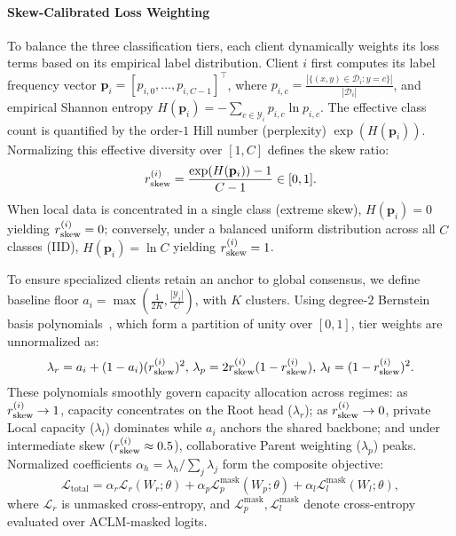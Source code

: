 \paragraph{Skew-Calibrated Loss Weighting}
To balance the three classification tiers, each client dynamically weights its loss terms based on its empirical label distribution. Client $i$ first computes its label frequency vector $\mathbf{p}_i = [p_{i,0}, \dots, p_{i,C-1}]^\top$, where $p_{i,c} = \frac{|\{(x,y) \in \mathcal{D}_i : y = c\}|}{|\mathcal{D}_i|}$, and empirical Shannon entropy $H(\mathbf{p}_i) = -\sum_{c \in \mathcal{Y}_i} p_{i,c} \ln p_{i,c}$. The effective class count is quantified by the order-$1$ Hill number (perplexity) $\exp(H(\mathbf{p}_i))$. Normalizing this effective diversity over $[1, C]$ defines the skew ratio:
\begin{equation}
\label{eq:rskew}
r_{\mathrm{skew}}^{(i)} = \frac{\exp(H(\mathbf{p}_i)) - 1}{C - 1} \in [0, 1].
\end{equation}
When local data is concentrated in a single class (extreme skew), $H(\mathbf{p}_i) = 0$ yielding $r_{\mathrm{skew}}^{(i)} = 0$; conversely, under a balanced uniform distribution across all $C$ classes (IID), $H(\mathbf{p}_i) = \ln C$ yielding $r_{\mathrm{skew}}^{(i)} = 1$.

To ensure specialized clients retain an anchor to global consensus, we define baseline floor $a_i = \max(\frac{1}{2K}, \frac{|\mathcal{Y}_i|}{C})$, with $K$ clusters. Using degree-$2$ Bernstein basis polynomials~\cite{lorentz1953bernstein}, which form a partition of unity over $[0, 1]$, tier weights are unnormalized as:
\begin{equation}
\label{eq:binomial_weights}
\lambda_r = a_i + (1-a_i)(r_{\mathrm{skew}}^{(i)})^2, \, \lambda_p = 2r_{\mathrm{skew}}^{(i)}(1-r_{\mathrm{skew}}^{(i)}), \, \lambda_l = (1-r_{\mathrm{skew}}^{(i)})^2.
\end{equation}
These polynomials smoothly govern capacity allocation across regimes: as $r_{\mathrm{skew}}^{(i)} \to 1$, capacity concentrates on the Root head ($\lambda_r$); as $r_{\mathrm{skew}}^{(i)} \to 0$, private Local capacity ($\lambda_l$) dominates while $a_i$ anchors the shared backbone; and under intermediate skew ($r_{\mathrm{skew}}^{(i)} \approx 0.5$), collaborative Parent weighting ($\lambda_p$) peaks. Normalized coefficients $\alpha_h = \lambda_h / \sum_j \lambda_j$ form the composite objective:
\begin{equation}
\mathcal{L}_{\mathrm{total}} = \alpha_r \mathcal{L}_r(W_r; \theta) + \alpha_p \mathcal{L}_p^{\mathrm{mask}}(W_p; \theta) + \alpha_l \mathcal{L}_l^{\mathrm{mask}}(W_l; \theta),
\end{equation}
where $\mathcal{L}_r$ is unmasked cross-entropy, and $\mathcal{L}_p^{\mathrm{mask}}, \mathcal{L}_l^{\mathrm{mask}}$ denote cross-entropy evaluated over ACLM-masked logits.

